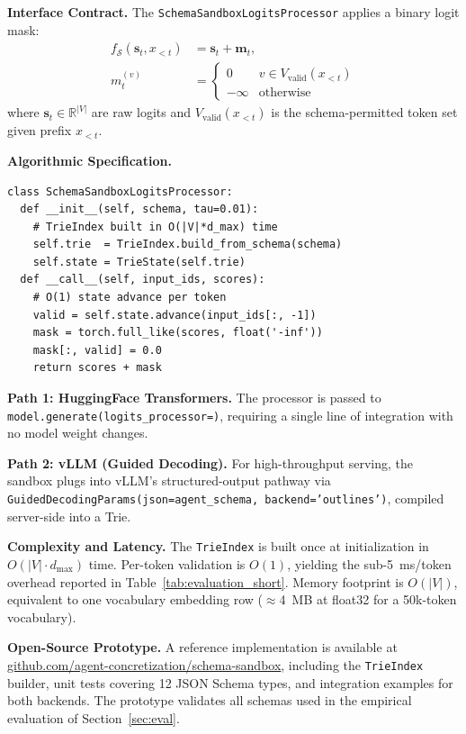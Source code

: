 \documentclass[10pt,journal,compsoc]{IEEEtran}
\begin{document}
\textbf{Interface Contract.} The \texttt{SchemaSandboxLogitsProcessor} applies a binary logit mask:
\begin{equation}
\begin{split}
  f_\mathcal{S}(\mathbf{s}_t, x_{<t}) &= \mathbf{s}_t + \mathbf{m}_t, \\
  m_t^{(v)} &= \begin{cases} 0 & v \in V_{\text{valid}}(x_{<t}) \\ -\infty & \text{otherwise} \end{cases}
\end{split}
\label{eq:logit_mask}
\end{equation}
where $\mathbf{s}_t \in \mathbb{R}^{|V|}$ are raw logits and $V_{\text{valid}}(x_{<t})$ is the schema-permitted token set given prefix $x_{<t}$.

\textbf{Algorithmic Specification.}\par\smallskip
\noindent
{\footnotesize
\begin{verbatim}
class SchemaSandboxLogitsProcessor:
  def __init__(self, schema, tau=0.01):
    # TrieIndex built in O(|V|*d_max) time
    self.trie  = TrieIndex.build_from_schema(schema)
    self.state = TrieState(self.trie)
  def __call__(self, input_ids, scores):
    # O(1) state advance per token
    valid = self.state.advance(input_ids[:, -1])
    mask = torch.full_like(scores, float('-inf'))
    mask[:, valid] = 0.0
    return scores + mask
\end{verbatim}
\par}

\textbf{Path 1: HuggingFace Transformers.} The processor is passed to \texttt{model.generate(\allowbreak logits\_processor=\allowbreak [processor])}, requiring a single line of integration with no model weight changes.

\textbf{Path 2: vLLM (Guided Decoding).} For high-throughput serving, the sandbox plugs into vLLM's structured-output pathway via \texttt{GuidedDecodingParams(\allowbreak json=agent\_schema, \allowbreak backend='outlines')}, compiled server-side into a Trie.

\textbf{Complexity and Latency.} The \texttt{TrieIndex} is built once at initialization in $O(|V| \cdot d_{\max})$ time. Per-token validation is $O(1)$, yielding the sub-5~ms/token overhead reported in Table~\ref{tab:evaluation_short}. Memory footprint is $O(|V|)$, equivalent to one vocabulary embedding row ($\approx$4~MB at float32 for a 50k-token vocabulary).

\textbf{Open-Source Prototype.} A reference implementation is available at \url{github.com/agent-concretization/schema-sandbox}, including the \texttt{TrieIndex} builder, unit tests covering 12 JSON Schema types, and integration examples for both backends. The prototype validates all schemas used in the empirical evaluation of Section~\ref{sec:eval}.
\end{document}
